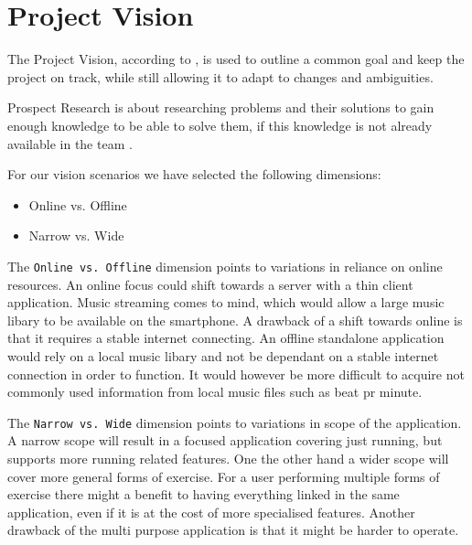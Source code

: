 \section{Project Vision}
The Project Vision, according to \citet[ p. 104]{essence}, is used to outline a common goal and keep the project on track, while still allowing it to adapt to changes and ambiguities.

Prospect Research is about researching problems and their solutions to gain enough knowledge to be able to solve them, if this knowledge is not already available in the team \citep[ pp. 104-105]{essence}.

For our vision scenarios \cite[ p. 127]{essence} we have selected the following dimensions:
\begin{itemize}
\item Online vs. Offline %
\item Narrow vs. Wide
\end{itemize}

The \texttt{Online vs. Offline} dimension points to variations in reliance on online resources. An online focus could shift  towards a server with a thin client application. Music streaming comes to mind, which would allow a large music libary to be available on the smartphone. A drawback of a shift towards online is that it requires a stable internet connecting. An offline standalone application would rely on a local music libary and not be dependant on a stable internet connection in order to function. It would however be more difficult to acquire not commonly used information from local music files such as beat pr minute.

The \texttt{Narrow vs. Wide} dimension points to variations in scope of the application. A narrow scope will result in a focused application covering just running, but supports more running related features. One the other hand a wider scope will cover more general forms of exercise. For a user performing multiple forms of exercise there might a benefit to having everything linked in the same application, even if it is at the cost of more specialised features. Another drawback of the multi purpose application is that it might be harder to operate.


